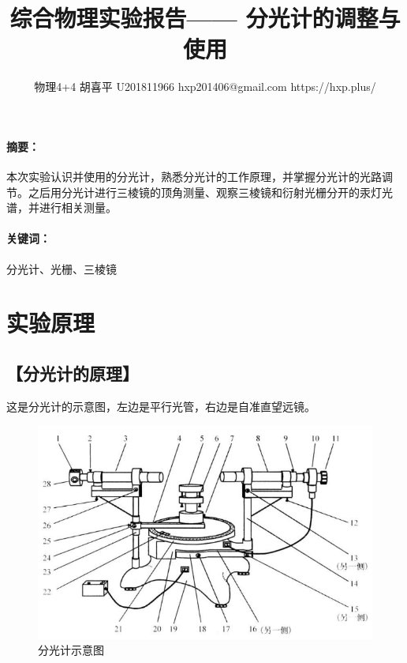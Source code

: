 \documentclass{ctexart}
\date{}
\newcommand{\generatetitle}[6]{\title{\zihao{3}\heiti#1} \author{#2 \quad
    \quad #3 \quad\quad #4 \quad\quad #5 \quad\quad #6} \maketitle\thispagestyle{fancy}}
\let\oldsubsection\subsection
\renewcommand{\subsection}[1]{\oldsubsection{\!\!\!\!\!\!【#1】}}
\let\oldparagraph\paragraph
\renewcommand{\paragraph}[1]{\oldparagraph{#1：\!\!\!\!\!\!}}
\begin{document}
\generatetitle{综合物理实验报告——
  分光计的调整与使用}{物理4+4}{胡喜平}{U201811966}{hxp201406@gmail.com}{https://hxp.plus/}

\paragraph{摘要}
本次实验认识并使用的分光计，熟悉分光计的工作原理，并掌握分光计的光路调节。之后用分光计进行三棱镜的顶角测量、观察三棱镜和衍射光栅分开的汞灯光谱，并进行相关测量。

\paragraph{关键词}
分光计、光栅、三棱镜

\section{实验原理}

\subsection{分光计的原理}

这是分光计的示意图，左边是平行光管，右边是自准直望远镜。

\begin{figure}[H]
  \centering
  \includegraphics[width=\linewidth]{figures/分光计示意图}
  \caption{分光计示意图}
  \label{fig:分光计示意图}
\end{figure}
\end{document}
